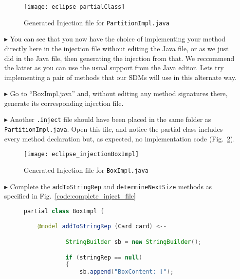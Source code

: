 \begin{itemize}
\begin{figure}[htbp]
    \centering
    \texttt{[image: eclipse\_partialClass]}
    \caption{Generated Injection file for \texttt{PartitionImpl.java}}
    \label{fig:injection_partialClassPartition}
\end{figure}

\clearpage

\item[$\blacktriangleright$] You can see that you now have the choice of implementing your method directly here in the injection file without editing the Java
file, or as we just did in the Java file, then generating the injection from that. We reccommend the latter as you can use the usual support from
the Java editor. Lets try implementing a pair of methods that our SDMs will use in this alternate way.

\item[$\blacktriangleright$] Go to ``BoxImpl.java'' and, without editing any method signatures there, generate its corresponding injection file.

\item[$\blacktriangleright$] Another \texttt{.inject} file should have been placed in the same folder as \texttt{PartitionImpl.java}. Open this file, and notice
the partial class includes every method declaration but, as expected, no implementation code (Fig.~\ref{fig:injection_partialClassBox}).

\begin{figure}[htbp]
    \centering
    \texttt{[image: eclipse\_injectionBoxImpl]}
    \caption{Generated Injection file for \texttt{BoxImpl.java}}
    \label{fig:injection_partialClassBox}
\end{figure}

\item[$\blacktriangleright$] Complete the \texttt{addToStringRep} and \texttt{determineNextSize} methods as specified in Fig.~\ref{code:complete_inject_file}

\begin{figure}[htbp]
        \centering
        \begin{lstlisting}[language=Java]
partial class BoxImpl {

    @model addToStringRep (Card card) <--

            StringBuilder sb = new StringBuilder();

            if (stringRep == null)
            {
                sb.append("BoxContent: [");


\end{lstlisting}
\end{figure}
\end{itemize}
